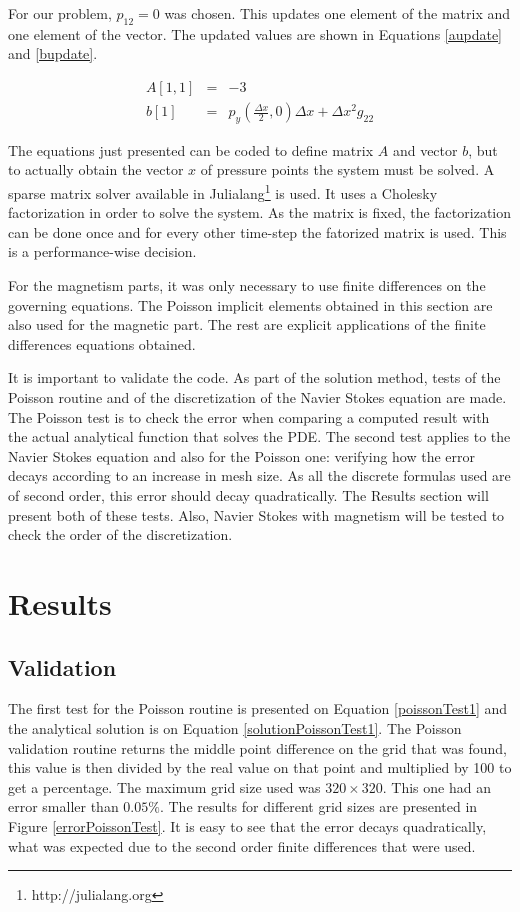 \documentclass[journal]{IEEEtran}
\begin{document}
For our problem, $p_{12} = 0$ was chosen. This updates one element of the matrix and one element of the vector. The updated values are shown in Equations \ref{aupdate} and \ref{bupdate}.

\begin{eqnarray}
A[1,1] &=& -3 \label{aupdate} \\
b[1] & = & p_y\left(\frac{\Delta x}{2},0\right)\Delta x + \Delta x^2 g_{22} \label{bupdate}
\end{eqnarray}

The equations just presented can be coded to define matrix $A$ and vector $b$, but to actually obtain the vector $x$ of pressure points the system must be solved. A sparse matrix solver available in Julialang\footnote{http://julialang.org} is used. It uses a Cholesky factorization in order to solve the system. As the matrix is fixed, the factorization can be done once and for every other time-step the fatorized matrix is used. This is a performance-wise decision.

For the magnetism parts, it was only necessary to use finite differences on the governing equations. The Poisson implicit elements obtained in this section are also used for the magnetic part. The rest are explicit applications of the finite differences equations obtained.

It is important to validate the code. As part of the solution method, tests of the Poisson routine and of the discretization of the Navier Stokes equation are made. The Poisson test is to check the error when comparing a computed result with the actual analytical function that solves the PDE. The second test applies to the Navier Stokes equation and also for the Poisson one: verifying how the error decays according to an increase in mesh size. As all the discrete formulas used are of second order, this error should decay quadratically. The Results section will present both of these tests. Also, Navier Stokes with magnetism will be tested to check the order of the discretization.

\section{Results}
\subsection{Validation}

The first test for the Poisson routine is presented on Equation \ref{poissonTest1} and the analytical solution is on Equation \ref{solutionPoissonTest1}. The Poisson validation routine returns the middle point difference on the grid that was found, this value is then divided by the real value on that point and multiplied by 100 to get a percentage. The maximum grid size used was $320\times 320$. This one had an error smaller than $0.05\%$. The results for different grid sizes are presented in Figure \ref{errorPoissonTest}. It is easy to see that the error decays quadratically, what was expected due to the second order finite differences that were used.
\end{document}
